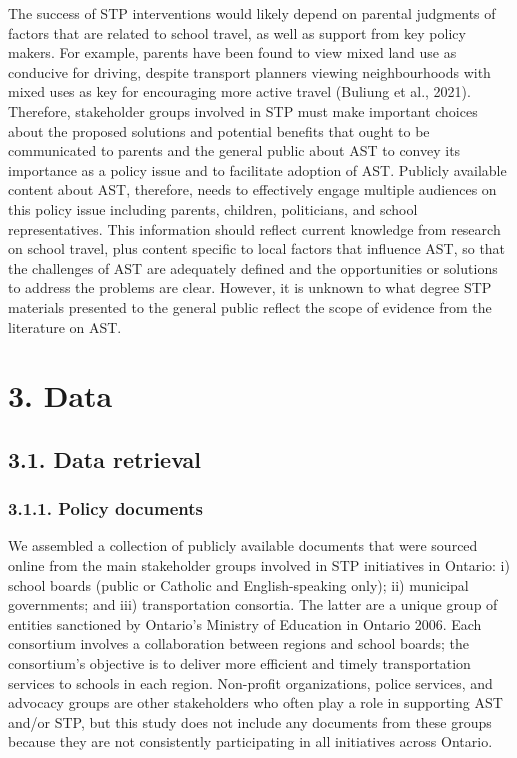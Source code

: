 \documentclass[]{elsarticle} %
\begin{document}
The success of STP interventions would likely depend on parental
judgments of factors that are related to school travel, as well as
support from key policy makers. For example, parents have been found to
view mixed land use as conducive for driving, despite transport planners
viewing neighbourhoods with mixed uses as key for encouraging more
active travel (Buliung et al., 2021). Therefore, stakeholder groups
involved in STP must make important choices about the proposed solutions
and potential benefits that ought to be communicated to parents and the
general public about AST to convey its importance as a policy issue and
to facilitate adoption of AST. Publicly available content about AST,
therefore, needs to effectively engage multiple audiences on this policy
issue including parents, children, politicians, and school
representatives. This information should reflect current knowledge from
research on school travel, plus content specific to local factors that
influence AST, so that the challenges of AST are adequately defined and
the opportunities or solutions to address the problems are clear.
However, it is unknown to what degree STP materials presented to the
general public reflect the scope of evidence from the literature on AST.

\hypertarget{data}{%
\section{3. Data}\label{data}}

\hypertarget{data-retrieval}{%
\subsection{3.1. Data retrieval}\label{data-retrieval}}

\hypertarget{policy-documents}{%
\subsubsection{3.1.1. Policy documents}\label{policy-documents}}

We assembled a collection of publicly available documents that were
sourced online from the main stakeholder groups involved in STP
initiatives in Ontario: i) school boards (public or Catholic and
English-speaking only); ii) municipal governments; and iii)
transportation consortia. The latter are a unique group of entities
sanctioned by Ontario's Ministry of Education in Ontario 2006. Each
consortium involves a collaboration between regions and school boards;
the consortium's objective is to deliver more efficient and timely
transportation services to schools in each region. Non-profit
organizations, police services, and advocacy groups are other
stakeholders who often play a role in supporting AST and/or STP, but
this study does not include any documents from these groups because they
are not consistently participating in all initiatives across Ontario.
\end{document}
